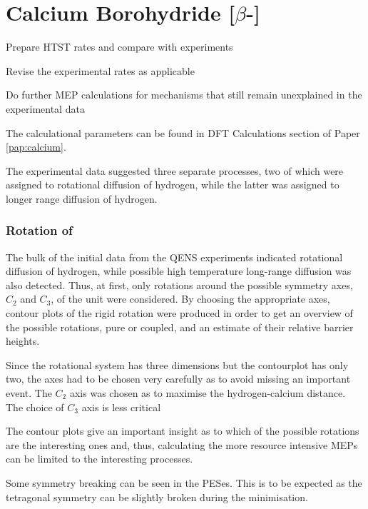 \section{Calcium Borohydride [$\beta$-]}
\label{sec:borohydrides-calcium}

\bit
\item Prepare HTST rates and compare with experiments
\item Revise the experimental rates as applicable
\item Do further MEP calculations for mechanisms that still remain unexplained in the experimental data
\eit

The calculational parameters can be found in DFT Calculations section of Paper \ref{pap:calcium}.

The experimental data suggested three separate processes, two of which were assigned to rotational diffusion of hydrogen, while the latter was assigned to longer range diffusion of hydrogen.

\subsubsection{Rotation of }
The bulk of the initial data from the QENS experiments indicated rotational diffusion of hydrogen, while possible high temperature long-range diffusion was also detected.
Thus, at first, only rotations around the possible symmetry axes, $C_2$ and $C_3$, of the  unit were considered.
By choosing the appropriate axes, contour plots of the rigid rotation were produced in order to get an overview of the possible rotations, pure or coupled, and an estimate of their relative barrier heights.


Since the rotational system has three dimensions but the contourplot has only two, the axes had to be chosen very carefully as to avoid missing an important event.
The $C_2$ axis was chosen as to maximise the hydrogen-calcium distance.
The choice of $C_3$ axis is less critical \expand

The contour plots give an important insight as to which of the possible rotations are the interesting ones and, thus, calculating the more resource intensive MEPs can be limited to the interesting processes.

Some symmetry breaking can be seen in the PESes.
This is to be expected as the tetragonal symmetry can be slightly broken during the minimisation.

